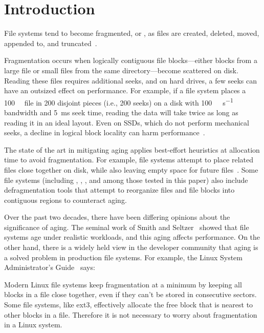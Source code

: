 \section{Introduction}\label{sec:fsa-intro}

File systems tend to become fragmented, or , as files are created,
deleted, moved, appended to, and
truncated~\cite{DBLP:conf/sigmetrics/SmithS97,DBLP:journals/tocs/McKusickJLF84}. 

Fragmentation occurs when logically contiguous file blocks---either
blocks from a large file or small files from the same
directory---become scattered on disk.  Reading these files requires
additional seeks, and on hard drives, a few seeks can have an
outsized effect on performance.  For example, if a file system places
a \SI{100}{\mebi\byte} file in \num{200} disjoint pieces (i.e.,
\num{200} seeks) on a disk with \SI{100}{\mebi\byte\per\second}
bandwidth and \SI{5}{\milli\second} seek time, reading the data will
take twice as long as reading it in an ideal layout.  Even on SSDs,
which do not perform mechanical seeks, a decline in logical block
locality can harm performance~\cite{DBLP:conf/fast/MinKCLE12}.

The state of the art in mitigating aging applies
best-effort heuristics at allocation time to avoid fragmentation.  
For example,
file systems attempt to place related files close together on disk, while also
leaving empty space for future files~\cite{DBLP:journals/tocs/McKusickJLF84,ext2,ext3,DBLP:journals/usenix-login/MathurCD07}.  Some file systems (including \ext, \xfs, \btrfs, and
\ftwofs among those tested in this paper) 
also include defragmentation tools that
attempt to reorganize files and file blocks into contiguous regions to
counteract aging.

Over the past two decades, there have been differing opinions about the
significance of aging.  The seminal work of Smith and
Seltzer~\cite{DBLP:conf/sigmetrics/SmithS97} showed that file systems age under
realistic workloads, and this aging affects
performance. 
On the other hand, there is a widely held view in the developer
community that aging is a solved problem in production file systems.
For example, the Linux System Administrator's
Guide~\cite{linux-system-admin-guide} says:
\begin{displayquote}
  Modern Linux file systems keep fragmentation at a minimum by keeping
  all blocks in a file close together, even if they can't be stored in
  consecutive sectors. Some file systems, like ext3, effectively
  allocate the free block that is nearest to other blocks in a
  file. Therefore it is not necessary to worry about fragmentation in
  a Linux system.
\end{displayquote}


